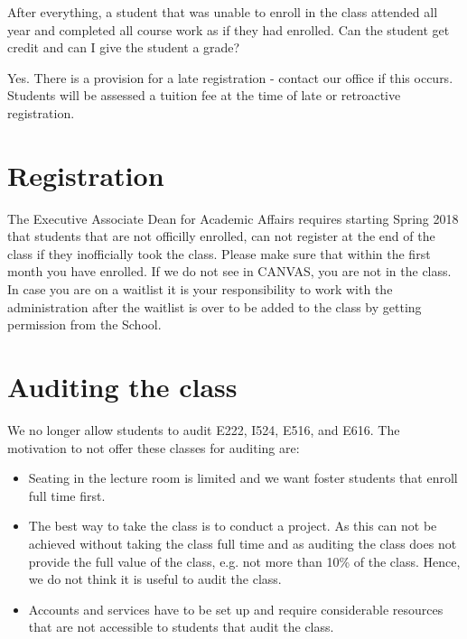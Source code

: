 After everything, a student that was unable to enroll in the class
attended all year and completed all course work as if they had enrolled.
Can the student get credit and can I give the student a grade?

Yes. There is a provision for a late registration - contact our office
if this occurs. Students will be assessed a tuition fee at the time of
late or retroactive registration.

\section{Registration}\label{S:register-mandatory}

The Executive Associate Dean for Academic Affairs requires starting
Spring 2018 that students that are not officilly enrolled, can not
register at the end of the class if they inofficially took the class.
Please make sure that within the first month you have enrolled. If we
do not see in CANVAS, you are not in the class. In case you are on a
waitlist it is your responsibility to work with the administration
after the waitlist is over to be added to the class by getting
permission from the School. 

\section{Auditing the class}\label{auditing-the-class}

We no longer allow students to audit E222, I524, E516, and E616. The
motivation to not offer these classes for auditing are:

\begin{itemize}
\item Seating in the lecture room is limited and we want foster
  students that enroll full time first.

\item The best way to take the class is to conduct a project. As this
  can not be achieved without taking the class full time and as
  auditing the class does not provide the full value of the class,
  e.g. not more than 10\% of the class. Hence, we do not think it is
  useful to audit the class.

\item  Accounts and services have to be set up and require
  considerable resources that are not accessible to students that
  audit the class.

\end{itemize}


